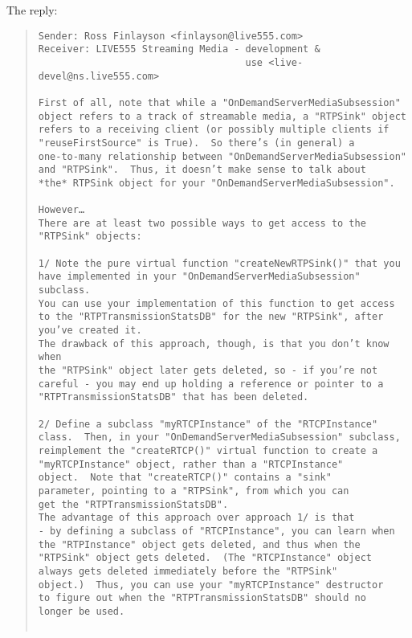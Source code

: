The reply:
\begin{quote}
\begin{verbatim}
Sender: Ross Finlayson <finlayson@live555.com>
Receiver: LIVE555 Streaming Media - development & 
									use <live-devel@ns.live555.com> 
									
First of all, note that while a "OnDemandServerMediaSubsession" 
object refers to a track of streamable media, a "RTPSink" object 
refers to a receiving client (or possibly multiple clients if 
"reuseFirstSource" is True).  So there’s (in general) a 
one-to-many relationship between "OnDemandServerMediaSubsession" 
and "RTPSink".  Thus, it doesn’t make sense to talk about 
*the* RTPSink object for your "OnDemandServerMediaSubsession".

However…
There are at least two possible ways to get access to the 
"RTPSink" objects:

1/ Note the pure virtual function "createNewRTPSink()" that you 
have implemented in your "OnDemandServerMediaSubsession" subclass.  
You can use your implementation of this function to get access 
to the "RTPTransmissionStatsDB" for the new "RTPSink", after 
you’ve created it.
The drawback of this approach, though, is that you don’t know when 
the "RTPSink" object later gets deleted, so - if you’re not 
careful - you may end up holding a reference or pointer to a 
"RTPTransmissionStatsDB" that has been deleted.

2/ Define a subclass "myRTCPInstance" of the "RTCPInstance" 
class.  Then, in your "OnDemandServerMediaSubsession" subclass, 
reimplement the "createRTCP()" virtual function to create a 
"myRTCPInstance" object, rather than a "RTCPInstance" 
object.  Note that "createRTCP()" contains a "sink" 
parameter, pointing to a "RTPSink", from which you can 
get the "RTPTransmissionStatsDB".
The advantage of this approach over approach 1/ is that 
- by defining a subclass of "RTCPInstance", you can learn when 
the "RTPInstance" object gets deleted, and thus when the 
"RTPSink" object gets deleted.  (The "RTCPInstance" object 
always gets deleted immediately before the "RTPSink" 
object.)  Thus, you can use your "myRTCPInstance" destructor 
to figure out when the "RTPTransmissionStatsDB" should no 
longer be used.
									
\end{verbatim}
\end{quote} 
